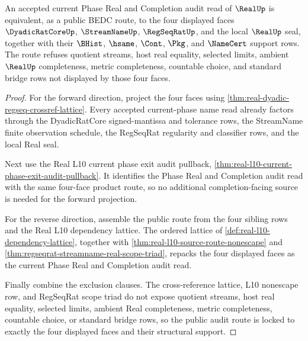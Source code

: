 \begin{theorem}
\label{thm:real-l10-four-face-phase-audit-lock}
An accepted current Phase Real and Completion audit read of $\RealUp$ is equivalent, as a public BEDC route, to the four displayed faces $\DyadicRatCoreUp$, $\StreamNameUp$, $\RegSeqRatUp$, and the local $\RealUp$ seal, together with their $\BHist$, $\hsame$, $\Cont$, $\Pkg$, and $\NameCert$ support rows. The route refuses quotient streams, host real equality, selected limits, ambient $\RealUp$ completeness, metric completeness, countable choice, and standard bridge rows not displayed by those four faces.
\end{theorem}
\begin{proof}
For the forward direction, project the four faces using \autoref{thm:real-dyadic-regseq-crossref-lattice}. Every accepted current-phase name read already factors through the DyadicRatCore signed-mantissa and tolerance rows, the StreamName finite observation schedule, the RegSeqRat regularity and classifier rows, and the local Real seal.

Next use the Real L10 current phase exit audit pullback, \autoref{thm:real-l10-current-phase-exit-audit-pullback}. It identifies the Phase Real and Completion audit read with the same four-face product route, so no additional completion-facing source is needed for the forward projection.

For the reverse direction, assemble the public route from the four sibling rows and the Real L10 dependency lattice. The ordered lattice of \autoref{def:real-l10-dependency-lattice}, together with \autoref{thm:real-l10-source-route-nonescape} and \autoref{thm:regseqrat-streamname-real-scope-triad}, repacks the four displayed faces as the current Phase Real and Completion audit read.

Finally combine the exclusion clauses. The cross-reference lattice, L10 nonescape row, and RegSeqRat scope triad do not expose quotient streams, host real equality, selected limits, ambient Real completeness, metric completeness, countable choice, or standard bridge rows, so the public audit route is locked to exactly the four displayed faces and their structural support.
\end{proof}

